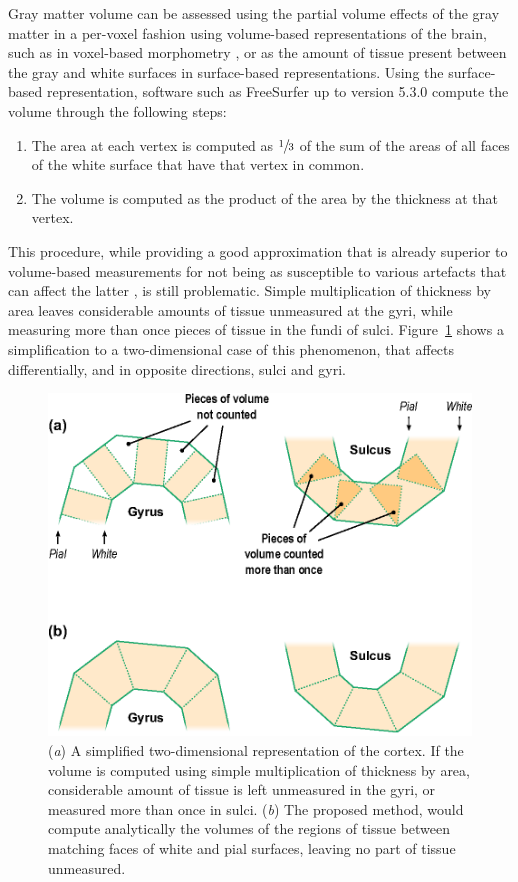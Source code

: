 Gray matter volume can be assessed using the partial volume effects of the gray matter in a per-voxel fashion using volume-based representations of the brain, such as in voxel-based morphometry \citep[\textsc{vbm}][]{Ashburner2000}, or as the amount of tissue present between the gray and white surfaces in surface-based representations. Using the surface-based representation, software such as FreeSurfer up to version 5.3.0 compute the volume through the following steps:

\begin{enumerate}
\item The area at each vertex is computed as $\sfrac{1}{3}$ of the sum of the areas of all faces of the white surface that have that vertex in common. 
\item The volume is computed as the product of the area by the thickness at that vertex.
\end{enumerate}

This procedure, while providing a good approximation that is already superior to volume-based measurements for not being as susceptible to various artefacts that can affect the latter \citep{Ashburner2009}, is still problematic. Simple multiplication of thickness by area leaves considerable amounts of tissue unmeasured at the gyri, while measuring more than once pieces of tissue in the fundi of sulci. Figure~\ref{fig:areal:mantle} shows a simplification to a two-dimensional case of this phenomenon, that affects differentially, and in opposite directions, sulci and gyri.

\begin{figure}[!tp]
\centering
\includegraphics{images/mantle.eps}
\caption[Simple multiplication leaves tissue over- or under-represented.]{(\emph{a}) A simplified two-dimensional representation of the cortex. If the volume is computed using simple multiplication of thickness by area, considerable amount of tissue is left unmeasured in the gyri, or measured more than once in sulci. (\emph{b}) The proposed method, would compute analytically the volumes of the regions of tissue between matching faces of white and pial surfaces, leaving no part of tissue unmeasured.}
\label{fig:areal:mantle}
\end{figure}

